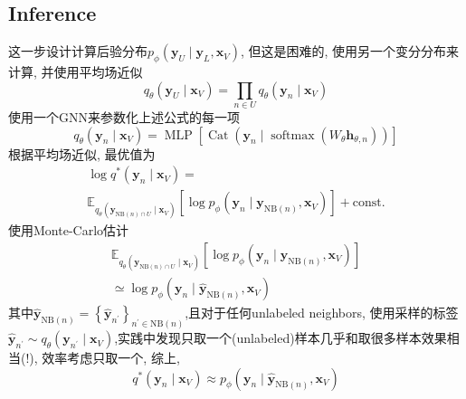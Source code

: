 \documentclass{article}
\begin{document}
\subsection{Inference}

    这一步设计计算后验分布$p_{\phi}\left(\mathbf{y}_{U} \mid \mathbf{y}_{L}, \mathbf{x}_{V}\right)$, 但这是困难的, 使用另一个变分分布来计算, 并使用平均场近似
    \begin{equation}
        q_{\theta}\left(\mathbf{y}_{U} \mid \mathbf{x}_{V}\right)=\prod_{n \in U} q_{\theta}\left(\mathbf{y}_{n} \mid \mathbf{x}_{V}\right)
    \end{equation}
    使用一个GNN来参数化上述公式的每一项
    \begin{equation}
        q_{\theta}\left(\mathbf{y}_{n} \mid \mathbf{x}_{V}\right)=\operatorname{MLP}[\operatorname{Cat}\left(\mathbf{y}_{n} \mid \operatorname{softmax}\left(W_{\theta} \mathbf{h}_{\theta, n}\right)\right)]
    \end{equation}
    根据平均场近似, 最优值为
    \begin{equation}
        \begin{array}{l}
        \log q^{*}\left(\mathbf{y}_{n} \mid \mathbf{x}_{V}\right)= \\
        \mathbb{E}_{q_{\theta}\left(\mathbf{y}_{\mathrm{NB}(n) \cap U} \mid \mathbf{x}_{V}\right)}\left[\log p_{\phi}\left(\mathbf{y}_{n} \mid \mathbf{y}_{\mathrm{NB}(n)}, \mathbf{x}_{V}\right)\right]+\mathrm{const.}
        \end{array}
    \end{equation}
    使用Monte-Carlo估计
    \begin{equation}
        \begin{array}{l}
        \mathbb{E}_{q_{\theta}\left(\mathbf{y}_{\mathrm{NB}(n) \cap U} \mid \mathbf{x}_{V}\right)}\left[\log p_{\phi}\left(\mathbf{y}_{n} \mid \mathbf{y}_{\mathrm{NB}(n)}, \mathbf{x}_{V}\right)\right] \\
        \simeq \log p_{\phi}\left(\mathbf{y}_{n} \mid \hat{\mathbf{y}}_{\mathrm{NB}(n)}, \mathbf{x}_{V}\right)
        \end{array}
    \end{equation}
    其中$\hat{\mathbf{y}}_{\mathrm{NB}(n)}=\left\{\hat{\mathbf{y}}_{n^{\prime}}\right\}_{n^{\prime} \in \mathrm{NB}(n)}$,且对于任何unlabeled neighbors, 使用采样的标签$\hat{\mathbf{y}}_{n^{\prime}} \sim q_{\theta}\left(\mathbf{y}_{n^{\prime}} \mid \mathbf{x}_{V}\right)$,实践中发现只取一个(unlabeled)样本几乎和取很多样本效果相当(!), 效率考虑只取一个, 综上,
    \begin{equation}
        q^{*}\left(\mathbf{y}_{n} \mid \mathbf{x}_{V}\right) \approx p_{\phi}\left(\mathbf{y}_{n} \mid \hat{\mathbf{y}}_{\mathrm{NB}(n)}, \mathbf{x}_{V}\right)
    \end{equation}
\end{document}
